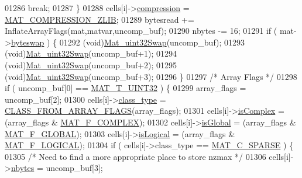 \begin{DoxyCode}
{{{{{{{01286                 \textcolor{keywordflow}{break};
01287             \}
01288             cells[i]->\hyperlink{group___m_a_t_aeef0466048621cb2c959ba7f6c774d06}{compression} = \hyperlink{group___m_a_t_gga768c318af97bd2567758ecb001ceb7f4a5181d2f71eab0f12f05ba65d4f13fb53}{MAT\_COMPRESSION\_ZLIB};
01289             bytesread += InflateArrayFlags(mat,matvar,uncomp\_buf);
01290             nbytes -= 16;
01291             \textcolor{keywordflow}{if} ( mat->\hyperlink{struct__mat__t_a99d207977af5e04941ace56d71817a40}{byteswap} ) \{
01292                 (void)\hyperlink{endian_8c_a8cb0d0750e2eaf9840d95db531934f4f}{Mat\_uint32Swap}(uncomp\_buf);
01293                 (void)\hyperlink{endian_8c_a8cb0d0750e2eaf9840d95db531934f4f}{Mat\_uint32Swap}(uncomp\_buf+1);
01294                 (void)\hyperlink{endian_8c_a8cb0d0750e2eaf9840d95db531934f4f}{Mat\_uint32Swap}(uncomp\_buf+2);
01295                 (void)\hyperlink{endian_8c_a8cb0d0750e2eaf9840d95db531934f4f}{Mat\_uint32Swap}(uncomp\_buf+3);
01296             \}
01297             \textcolor{comment}{/* Array Flags */}
01298             \textcolor{keywordflow}{if} ( uncomp\_buf[0] == \hyperlink{group___m_a_t_ggacf7b3b879282b7ab3a51190e49bf3453aa397e285a23fe240368b752897652c6a}{MAT\_T\_UINT32} ) \{
01299                array\_flags = uncomp\_buf[2];
01300                cells[i]->\hyperlink{group___m_a_t_aff13035bf3265dd7d9425e5d40c839d4}{class\_type} = \hyperlink{mat5_8c_a85a616d27707e89bda9fd2e9bbb6a586}{CLASS\_FROM\_ARRAY\_FLAGS}(array\_flags);
01301                cells[i]->\hyperlink{group___m_a_t_aeb03b3a69f108dc05470b00443a43739}{isComplex}  = (array\_flags & \hyperlink{group___m_a_t_ggab9d6ef9e3ddca78a317b173f01d53fbbacd7b091a11184aad7fc6078c04470780}{MAT\_F\_COMPLEX});
01302                cells[i]->\hyperlink{group___m_a_t_af26c71c4c0ddb14931d15910dddac1bc}{isGlobal}   = (array\_flags & \hyperlink{group___m_a_t_ggab9d6ef9e3ddca78a317b173f01d53fbba49084e0c796aa7963e53f7539525d40d}{MAT\_F\_GLOBAL});
01303                cells[i]->\hyperlink{group___m_a_t_a866c1539e68073a837833d74cd4a65be}{isLogical}  = (array\_flags & \hyperlink{group___m_a_t_ggab9d6ef9e3ddca78a317b173f01d53fbba57eb5c6e200bcbc0f1b7982f29a169c2}{MAT\_F\_LOGICAL});
01304                \textcolor{keywordflow}{if} ( cells[i]->class\_type == \hyperlink{group___m_a_t_ggad4d60ae7b709fc81bfd744fb4c857c40a0d5655b7e6178a2242cb3bb56ff4c8d2}{MAT\_C\_SPARSE} ) \{
01305                    \textcolor{comment}{/* Need to find a more appropriate place to store nzmax */}
01306                    cells[i]->\hyperlink{group___m_a_t_abf1c844540503be2df9bb3db93cfe307}{nbytes} = uncomp\_buf[3];
}}}}}}}
\end{DoxyCode}
